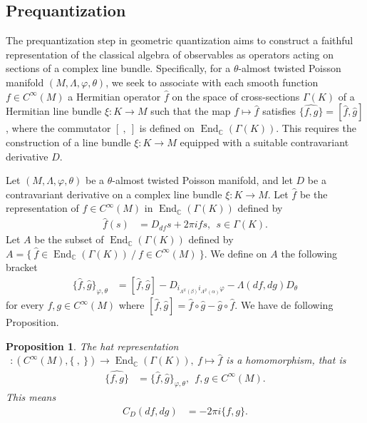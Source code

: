 \documentclass[a4paper,10pt]{article}
\numberwithin{equation}{section}
\theoremstyle{plain}
\newtheorem{proposition}[theorem]{Proposition}
\begin{document}
	\subsection{Prequantization }
The prequantization step in geometric quantization aims to construct a faithful representation of the classical algebra of observables as operators acting on sections of a complex line bundle. Specifically, for a $\theta$-almost twisted Poisson manifold $(M,\Lambda,\varphi,\theta)$, we seek to associate with each smooth function $f\in C^\infty(M)$ a Hermitian operator $\hat{f}$ on the space of cross-sections $\Gamma(K)$ of a Hermitian line bundle $\xi: K\to M$ such that the map $f\mapsto \hat{f}$ satisfies $\widehat{\{f,g\}}=[\hat{f},\hat{g}] $, where the commutator $[\ ,\ ]$  is defined on  $\operatorname{End}_\mathbb{C}(\Gamma(K))$. This requires the construction of a line bundle $\xi: K\to M$ equipped with a suitable contravariant derivative $D$.

Let $(M,\Lambda,\varphi,\theta)$ be a $\theta$-almost twisted Poisson manifold, and let $D$ be a contravariant derivative on a complex line bundle $\xi: K\to M$. Let $\hat{f}$ be the representation of $f\in C^\infty(M)$ in $\operatorname{End}_\mathbb{C}(\Gamma(K))$ defined by
	\begin{align}\label{g1}
	\hat{f}(s)&=D_{df}s+2\pi ifs,\ \ s\in \Gamma(K).
	\end{align}
	Let $A$ be  the subset of $\operatorname{End}_\mathbb{C}(\Gamma(K))$ defined by $A=\{\ \hat{f}\in \operatorname{End}_\mathbb{C}(\Gamma(K))\ \slash \ f\in C^\infty(M)\ \}$.  We define on $A$ the following bracket
	\begin{align}
	\{\hat{f},\hat{g}\}_{\varphi,\theta}&=[\hat{f},\hat{g}]-D_{i_{\Lambda^{\#}(\beta)}i_{\Lambda^{\#}(\alpha)}\varphi}-\Lambda(df,dg)D_\theta
	\end{align}
	for every  $f,g\in C^\infty(M)$ where $[\hat{f},\hat{g}]=\hat{f}\circ \hat{g}-\hat{g}\circ\hat{f}$.
	We have de following Proposition.
	
	\begin{proposition}
		The hat representation  \ \  $\widehat{} \ \ : (C^\infty(M), \{\ ,\ \})\longrightarrow \operatorname{End}_\mathbb{C}(\Gamma(K)),\ f\mapsto \hat{f}$ is a homomorphism, that is
		\begin{align}\label{g4}
		\widehat{\{f,g\}}&=\{\hat{f},\hat{g}\}_{\varphi,\theta},\ \  f,g\in C^\infty(M).
		\end{align}
		This means
		\begin{align}\label{sl1}
		C_D(df,dg)&=-2\pi i\{f,g\}.
		\end{align}
	\end{proposition}
	
\end{document}
